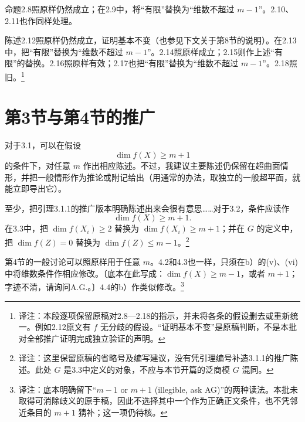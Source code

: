 \documentclass[openany,fontset=fandol]{ctexbook}
\newcommand{\note}[1]{\footnote{译注：#1}}
\begin{document}
命题2.8照原样仍然成立；在2.9中，将“有限”替换为“维数不超过 $m-1$”。2.10、2.11也作同样处理。

陈述2.12照原样仍然成立，证明基本不变（也参见下文关于第8节的说明）。在2.13中，把“有限”替换为“维数不超过 $m-1$”。2.14照原样成立；2.15则作上述“有限”的替换。2.16照原样有效；2.17也把“有限”替换为“维数不超过 $m-1$”。2.18照旧。\note{本段逐项保留原稿对2.8—2.18的指示，并未将各条的假设删去或重新统一。例如2.12原文有 $f$ 无分歧的假设。“证明基本不变”是原稿判断，不是本批对全部推广证明完成独立验证的声明。}

\section*{第3节与第4节的推广}
对于3.1，可以在假设
\[
\dim f(X)\geq m+1
\]
的条件下，对任意 $m$ 作出相应陈述。不过，我建议主要陈述仍保留在超曲面情形，并把一般情形作为推论或附记给出（用通常的办法，取独立的一般超平面，就能立即导出它）。

至少，把引理3.1.1的推广版本明确陈述出来会很有意思……对于3.2，条件应读作
\[
\dim f(X)\geq m+1.
\]
在3.3中，把 $\dim f(X_i)\geq2$ 替换为 $\dim f(X_i)\geq m+1$；并在 $G$ 的定义中，把 $\dim f(Z)=0$ 替换为 $\dim f(Z)\leq m-1$。\note{这里保留原稿的省略号及编写建议，没有凭引理编号补造3.1.1的推广陈述。此处 $G$ 是3.3中定义的对象，不应与本节开篇的泛商模 $G$ 混同。}

\enlargethispage{2\baselineskip}
第4节的一般讨论可以照原样用于任意 $m$。4.2和4.3也一样，只须在b）的(v)、(vi)中将维数条件作相应修改。〔底本在此写成：$\dim f(X)\geq m-1$，或者 $m+1$；字迹不清，请询问A.G.。〕4.4的b）作类似修改。\note{底本明确留下“$m-1$ or $m+1$ (illegible, ask AG)”的两种读法。本批未取得可消除歧义的原手稿，因此不选择其中一个作为正确正文条件，也不凭邻近条目的 $m+1$ 猜补；这一项仍待核。}
\end{document}
